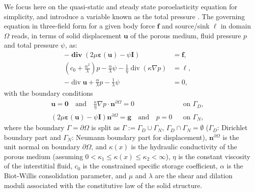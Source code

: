 \documentclass[smallextended]{svjour3}
\numberwithin{equation}{section}
\numberwithin{figure}{section}
\numberwithin{table}{section}
\newcommand\cero{{\boldsymbol{0}}}
\newcommand\bI{\mathbf{I}}
\newcommand\ff{\boldsymbol{f}}
\newcommand\bg{\boldsymbol{g}}
\newcommand\beps{\boldsymbol{\varepsilon}}
\newcommand\nn{{\boldsymbol{n}}}
\newcommand\bu{\boldsymbol{u}}
\newcommand\bdiv{{\mathop{\mathbf{div}}\nolimits}}
\newcommand\vdiv{{\mathop{\mathrm{div}}\nolimits}}
\begin{document}
We focus here on the quasi-static and steady state poroelasticity equation for simplicity, and introduce a variable known as the total pressure \cite{or_sinum16}. The governing equation in three-field form
for a given body force $\ff$ and source/sink $\ell$ in domain $\Omega$ reads, in terms of solid displacement $\bu$ of the porous medium, fluid pressure $p$ and total pressure $\psi$, as: 
	\begin{subequations}\label{eq:strong-poro}
		\begin{align}
			-\bdiv(2{\mu} \beps(\bu)  -\psi \bI)  &= \ff, \label{eq:momentum}\\
			\left(c_0 + \frac{\alpha^2}{\lambda} \right) p - \frac{\alpha}{\lambda} \psi - \frac{1}{\eta} \vdiv(\kappa  \nabla p ) &= \ell, \label{eq:massconservation}\\
			 -\vdiv \bu + \frac{\alpha}{\lambda} p - \frac{1}{\lambda} \psi &=0, \label{eq:totalpres} 
		\end{align}
	\end{subequations}
	with the boundary conditions
	\begin{subequations}\label{eq:bc}
		\begin{align}
			\bu = \cero \quad \text{and} \quad \frac{\kappa}{\eta} \nabla p \cdot\nn^{\partial \Omega} = 0  & &\text{on $\Gamma_D$}, \label{bc:Dirichlet}\\
			(2{\mu} \beps(\bu)  -\psi \bI) \nn^{\partial \Omega} = \bg \quad  \text{and}\quad p=0
			& &\text{on $\Gamma_N$}, \label{bc:Neumann}
		\end{align}
	\end{subequations}
	where the boundary $\Gamma= \partial \Omega$ is split as $\Gamma:= \Gamma_D \cup\Gamma_N$, $\Gamma_D \cap\Gamma_N = \emptyset$ ($\Gamma_D$: Dirichlet boundary part and $\Gamma_N$: Neumann boundary part for displacement), $\nn^{\partial \Omega}$ is the unit normal on boundary $\partial \Omega$, and $\kappa(x)$ is the hydraulic conductivity of the porous medium (assuming $0<\kappa_1 \le \kappa(x) \le \kappa_2 < \infty$), 
    $\eta$ is the constant viscosity of the interstitial fluid, $c_0$ is the constrained specific storage coefficient, 
    $\alpha$ is the Biot-Willis consolidation parameter, 
    and $\mu$ and $\lambda$ are the shear and dilation moduli associated with the constitutive law of the solid structure.
\end{document}

